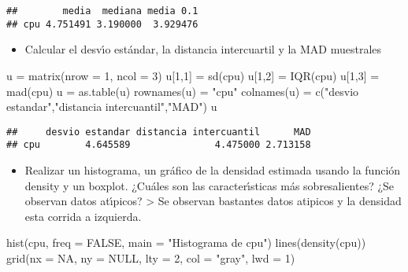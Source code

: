 \documentclass[
]{article}
\newenvironment{Shaded}{\begin{snugshade}}{\end{snugshade}}
\newcommand{\AttributeTok}[1]{\textcolor[rgb]{0.77,0.63,0.00}{#1}}
\newcommand{\ConstantTok}[1]{\textcolor[rgb]{0.00,0.00,0.00}{#1}}
\newcommand{\DecValTok}[1]{\textcolor[rgb]{0.00,0.00,0.81}{#1}}
\newcommand{\FunctionTok}[1]{\textcolor[rgb]{0.00,0.00,0.00}{#1}}
\newcommand{\NormalTok}[1]{#1}
\newcommand{\OtherTok}[1]{\textcolor[rgb]{0.56,0.35,0.01}{#1}}
\newcommand{\StringTok}[1]{\textcolor[rgb]{0.31,0.60,0.02}{#1}}
\providecommand{\tightlist}{%
  \setlength{\itemsep}{0pt}\setlength{\parskip}{0pt}}
\begin{document}
\begin{verbatim}
##        media  mediana media 0.1
## cpu 4.751491 3.190000  3.929476
\end{verbatim}

\begin{itemize}
\tightlist
\item
  Calcular el desvı́o estándar, la distancia intercuartil y la MAD
  muestrales
\end{itemize}

\begin{Shaded}
\begin{Highlighting}[]
\NormalTok{u }\OtherTok{=} \FunctionTok{matrix}\NormalTok{(}\AttributeTok{nrow =} \DecValTok{1}\NormalTok{, }\AttributeTok{ncol =} \DecValTok{3}\NormalTok{)}
\NormalTok{u[}\DecValTok{1}\NormalTok{,}\DecValTok{1}\NormalTok{] }\OtherTok{=} \FunctionTok{sd}\NormalTok{(cpu)}
\NormalTok{u[}\DecValTok{1}\NormalTok{,}\DecValTok{2}\NormalTok{] }\OtherTok{=} \FunctionTok{IQR}\NormalTok{(cpu)}
\NormalTok{u[}\DecValTok{1}\NormalTok{,}\DecValTok{3}\NormalTok{] }\OtherTok{=} \FunctionTok{mad}\NormalTok{(cpu)}
\NormalTok{u }\OtherTok{=} \FunctionTok{as.table}\NormalTok{(u)}
\FunctionTok{rownames}\NormalTok{(u) }\OtherTok{=} \StringTok{"cpu"}
\FunctionTok{colnames}\NormalTok{(u) }\OtherTok{=} \FunctionTok{c}\NormalTok{(}\StringTok{"desvio estandar"}\NormalTok{,}\StringTok{"distancia intercuantil"}\NormalTok{,}\StringTok{"MAD"}\NormalTok{)}
\NormalTok{u}
\end{Highlighting}
\end{Shaded}

\begin{verbatim}
##     desvio estandar distancia intercuantil      MAD
## cpu        4.645589               4.475000 2.713158
\end{verbatim}

\begin{itemize}
\tightlist
\item
  Realizar un histograma, un gráfico de la densidad estimada usando la
  función density y un boxplot. ¿Cuáles son las caracterı́sticas más
  sobresalientes? ¿Se observan datos atı́picos? \textgreater{} Se
  observan bastantes datos atipicos y la densidad esta corrida a
  izquierda.
\end{itemize}

\begin{Shaded}
\begin{Highlighting}[]
\FunctionTok{hist}\NormalTok{(cpu, }\AttributeTok{freq =} \ConstantTok{FALSE}\NormalTok{, }\AttributeTok{main =} \StringTok{"Histograma de cpu"}\NormalTok{)}
\FunctionTok{lines}\NormalTok{(}\FunctionTok{density}\NormalTok{(cpu))}
\FunctionTok{grid}\NormalTok{(}\AttributeTok{nx =} \ConstantTok{NA}\NormalTok{, }\AttributeTok{ny =} \ConstantTok{NULL}\NormalTok{, }\AttributeTok{lty =} \DecValTok{2}\NormalTok{, }\AttributeTok{col =} \StringTok{"gray"}\NormalTok{, }\AttributeTok{lwd =} \DecValTok{1}\NormalTok{)}
\end{Highlighting}
\end{Shaded}
\end{document}

